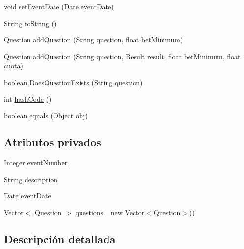 \begin{DoxyCompactItemize}
void \mbox{\hyperlink{classdomain_1_1Event_ab27cd00d447385efcdfa8eeca32f8088}{set\+Event\+Date}} (Date \mbox{\hyperlink{classdomain_1_1Event_a3cc1c6dde4868b8048cc2dc0626cd269}{event\+Date}})
\item 
String \mbox{\hyperlink{classdomain_1_1Event_a0d1615cfe917523681dde8d72190c327}{to\+String}} ()
\item 
\mbox{\hyperlink{classdomain_1_1Question}{Question}} \mbox{\hyperlink{classdomain_1_1Event_a6e0414a3ec8ad5169aedd5dd068fc4cf}{add\+Question}} (String question, float bet\+Minimum)
\item 
\mbox{\hyperlink{classdomain_1_1Question}{Question}} \mbox{\hyperlink{classdomain_1_1Event_a3eaf7a3d45a8c285684e4434ea3d91b0}{add\+Question}} (String question, \mbox{\hyperlink{classdomain_1_1Result}{Result}} result, float bet\+Minimum, float cuota)
\item 
boolean \mbox{\hyperlink{classdomain_1_1Event_ad41c734db360bd942b9028ddbefc77d2}{Does\+Question\+Exists}} (String question)
\item 
int \mbox{\hyperlink{classdomain_1_1Event_a8fc944944dd04c43c73bab5068b5349e}{hash\+Code}} ()
\item 
boolean \mbox{\hyperlink{classdomain_1_1Event_aeb56c0c6301d176e3f861ae04f50fab7}{equals}} (Object obj)
\end{DoxyCompactItemize}
\subsection*{Atributos privados}
\begin{DoxyCompactItemize}
\item 
Integer \mbox{\hyperlink{classdomain_1_1Event_a7a297461605e871f55e9752c5652a07e}{event\+Number}}
\item 
String \mbox{\hyperlink{classdomain_1_1Event_a14d38176e81b4e75c84d4aaea994a306}{description}}
\item 
Date \mbox{\hyperlink{classdomain_1_1Event_a3cc1c6dde4868b8048cc2dc0626cd269}{event\+Date}}
\item 
Vector$<$ \mbox{\hyperlink{classdomain_1_1Question}{Question}} $>$ \mbox{\hyperlink{classdomain_1_1Event_ab5621abc5bae7bc3d8ece713fa2e1e38}{questions}} =new Vector$<$\mbox{\hyperlink{classdomain_1_1Question}{Question}}$>$()
\end{DoxyCompactItemize}


\subsection{Descripción detallada}



